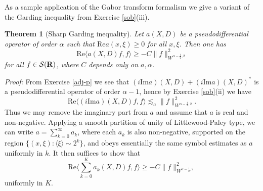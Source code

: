 \documentclass[11pt]{article}
\newtheorem{theorem}{Theorem}
\theoremstyle{definition}
\theoremstyle{remark}
\begin{document}
As a sample application of the Gabor transform formalism we give a variant of the Garding inequality from Exercise \ref{sob}(iii).

\begin{theorem}[Sharp Garding inequality]
  Let \({a(X,D)}\) be a pseudodifferential operator of order \({\alpha}\) such that \({\mathrm{Re} a(x,\xi) \geq 0}\) for all \({x,\xi}\). Then one has 
\[\displaystyle  \mathrm{Re} \langle a(X,D) f, f \rangle \geq -C \|f\|_{W^{\alpha-\frac{1}{2},2}}^2\]
 for all \({f \in {\mathcal S}({\bf R})}\), where \({C}\) depends only on \({a,\alpha}\). 
\end{theorem}

\emph{Proof:}  From Exercise \ref{adj-p} we see that \({(i \mathrm{Im} a)(X,D) + (i \mathrm{Im} a)(X,D)^*}\) is a pseudodifferential operator of order \({\alpha-1}\), hence by Exercise \ref{sob}(ii) we have 
\[\displaystyle  \mathrm{Re} \langle (i \mathrm{Im} a)(X,D) f, f \rangle \lesssim_a \|f\|_{W^{\alpha-\frac{1}{2},2}}^2.\]
 Thus we may remove the imaginary part from \({a}\) and assume that \({a}\) is real and non-negative. Applying a smooth partition of unity of Littlewood-Paley type, we can write \({a = \sum_{k=0}^\infty a_k}\), where each \({a_k}\) is also non-negative, supported on the region \({\{ (x,\xi): \langle \xi \rangle \sim 2^k \}}\), and obeys essentially the same symbol estimates as \({a}\) uniformly in \({k}\). It then suffices to show that 
\[\displaystyle  \mathrm{Re} \langle \sum_{k=0}^K a_k(X,D) f, f \rangle \geq -C \|f\|_{W^{\alpha-\frac{1}{2},2}}^2\]
 uniformly in \({K}\). 
\end{document}
